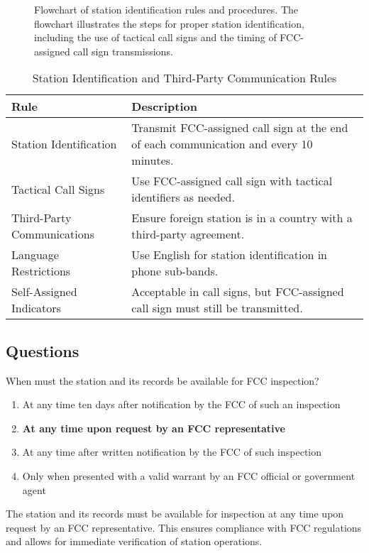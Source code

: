 \begin{figure}[h]
    \centering
    \caption{Flowchart of station identification rules and procedures. The flowchart illustrates the steps for proper station identification, including the use of tactical call signs and the timing of FCC-assigned call sign transmissions.}
    \label{fig:station_identification}
\end{figure}

\begin{table}[h]
    \centering
    \begin{tabular}{|l|l|}
        \hline
        \textbf{Rule} & \textbf{Description} \\
        \hline
        Station Identification & Transmit FCC-assigned call sign at the end of each communication and every 10 minutes. \\
        Tactical Call Signs & Use FCC-assigned call sign with tactical identifiers as needed. \\
        Third-Party Communications & Ensure foreign station is in a country with a third-party agreement. \\
        Language Restrictions & Use English for station identification in phone sub-bands. \\
        Self-Assigned Indicators & Acceptable in call signs, but FCC-assigned call sign must still be transmitted. \\
        \hline
    \end{tabular}
    \caption{Station Identification and Third-Party Communication Rules}
    \label{tab:station_identification}
\end{table}

\subsection*{Questions}
\begin{tcolorbox}[colback=gray!10!white,colframe=black!75!black,title={T1F01}]
    When must the station and its records be available for FCC inspection?
    \begin{enumerate}[label=\Alph*,noitemsep]
        \item At any time ten days after notification by the FCC of such an inspection
        \item \textbf{At any time upon request by an FCC representative}
        \item At any time after written notification by the FCC of such inspection
        \item Only when presented with a valid warrant by an FCC official or government agent
    \end{enumerate}
\end{tcolorbox}
The station and its records must be available for inspection at any time upon request by an FCC representative. This ensures compliance with FCC regulations and allows for immediate verification of station operations.

